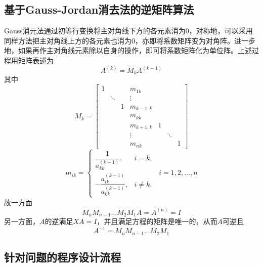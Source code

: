 \documentclass[UTF8,a4paper,10pt]{ctexart}
\begin{document}
        \subsection{基于Gauss-Jordan消去法的逆矩阵算法}
            Gauss消元法通过初等行变换将主对角线下方的各元素消为0，对称地，可以采用同样方法把主对角线上方的各元素也消为0，亦即将系数矩阵变为对角阵。进一步地，如果再作主对角线元素除以自身的操作，即可将系数矩阵化为单位阵。上述过程用矩阵表述为
            $$
            A^{(k)}=M_kA^{(k-1)}
            $$
            其中
            $$
            M_k=
                \begin{bmatrix}
                    1 & \  & \  & m_{1k} & \  & \  & \  \\
                    \  & \ddots & \  & \vdots & \  & \  & \  \\
                    \  & \  & 1 & m_{k-1,k} & \  & \  & \  \\
                    \  & \  & \  & m_{kk} & \  & \  & \  \\
                    \  & \  & \  & m_{k+1,k} & 1 & \  & \  \\
                    \  & \  & \  & \vdots & \  & \ddots & \  \\
                    \  & \  & \  & m_{nk} & \  & \  & 1
                \end{bmatrix}
            $$
            $$
            m_{ik}=
                \begin{cases}
                    \dfrac{1}{a_{kk}^{(k-1)}},&i=k, \\
                    -\dfrac{a_{ik}^{(k-1)}}{a_{kk}^{(k-1)}},&i\neq k,
                \end{cases}
            \ \ i=1,2,\dots,n
            $$
            故一方面
            $$
            M_n M_{n-1} \dots M_2 M_1 A=A^{(n)}=I
            $$
            另一方面，$A$的逆满足$XA=I$，并且满足方程的矩阵是唯一的，从而$A$可逆且
            $$
            A^{-1}=M_n M_{n-1} \dots M_2 M_1
            $$
        \subsection{针对问题的程序设计流程}
\end{document}
